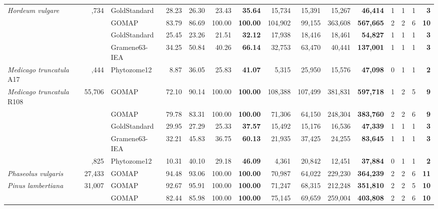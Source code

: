 \documentclass[utf8]{frontiersSCNS}
\begin{document}
\begin{table}[t]
{\begin{threeparttable}
\begin{tabular}{lrlrrr>{\bfseries}r|rrr>{\bfseries}r|rrr>{\bfseries}r}
\multirow{-2}{*}{\raggedright\arraybackslash \textit{Hordeum vulgare}} & \multirow{-2}{*}{\raggedleft\arraybackslash 39,734} & GoldStandard & 28.23 & 26.30 & 23.43 & 35.64 & 15,734 & 15,391 & 15,267 & 46,414 & 1 & 1 & 1 & 3\\
\cmidrule{1-15}
\rowcolor{gray!6}   &  & GOMAP & 83.79 & 86.69 & 100.00 & 100.00 & 104,902 & 99,155 & 363,608 & 567,665 & 2 & 2 & 6 & 10\\

 &  & GoldStandard & 25.45 & 23.26 & 21.51 & 32.12 & 17,938 & 18,416 & 18,461 & 54,827 & 1 & 1 & 1 & 3\\

\rowcolor{gray!6}   &  & Gramene63-IEA & 34.25 & 50.84 & 40.26 & 66.14 & 32,753 & 63,470 & 40,441 & 137,001 & 1 & 1 & 1 & 3\\

\multirow{-4}{*}{\raggedright\arraybackslash \textit{Medicago truncatula} A17} & \multirow{-4}{*}{\raggedleft\arraybackslash 50,444} & Phytozome12 & 8.87 & 36.05 & 25.83 & 41.07 & 5,315 & 25,950 & 15,576 & 47,098 & 0 & 1 & 1 & 2\\
\cmidrule{1-15}
\rowcolor{gray!6}  \textit{Medicago truncatula} R108 & 55,706 & GOMAP & 72.10 & 90.14 & 100.00 & 100.00 & 108,388 & 107,499 & 381,831 & 597,718 & 1 & 2 & 5 & 9\\
\cmidrule{1-15}
 &  & GOMAP & 79.78 & 83.31 & 100.00 & 100.00 & 71,306 & 64,150 & 248,304 & 383,760 & 2 & 2 & 6 & 9\\

\rowcolor{gray!6}   &  & GoldStandard & 29.95 & 27.29 & 25.33 & 37.57 & 15,492 & 15,176 & 16,536 & 47,339 & 1 & 1 & 1 & 3\\

 &  & Gramene63-IEA & 32.21 & 45.83 & 36.75 & 60.13 & 21,935 & 37,425 & 24,255 & 83,645 & 1 & 1 & 1 & 3\\

\rowcolor{gray!6}  \multirow{-4}{*}{\raggedright\arraybackslash \textit{Oryza sativa}} & \multirow{-4}{*}{\raggedleft\arraybackslash 35,825} & Phytozome12 & 10.31 & 40.10 & 29.18 & 46.09 & 4,361 & 20,842 & 12,451 & 37,884 & 0 & 1 & 1 & 2\\
\cmidrule{1-15}
\textit{Phaseolus vulgaris} & 27,433 & GOMAP & 94.48 & 93.06 & 100.00 & 100.00 & 70,987 & 64,022 & 229,230 & 364,239 & 2 & 2 & 6 & 11\\
\cmidrule{1-15}
\rowcolor{gray!6}  \textit{Pinus lambertiana} & 31,007 & GOMAP & 92.67 & 95.91 & 100.00 & 100.00 & 71,247 & 68,315 & 212,248 & 351,810 & 2 & 2 & 5 & 10\\
\cmidrule{1-15}
 &  & GOMAP & 82.44 & 85.98 & 100.00 & 100.00 & 75,145 & 69,659 & 259,004 & 403,808 & 2 & 2 & 6 & 10\\


\end{tabular}
\end{threeparttable}}
\end{table}
\end{document}
